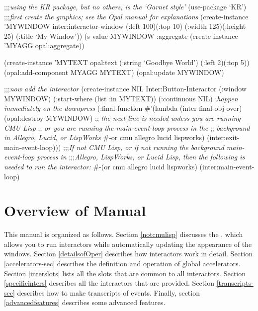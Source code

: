 \label{eventloopexample}
\begin{programexample}
;;;{\it using the KR package, but no others, is the `Garnet style'}
(use-package `KR')
;;;{\it first create the graphics; see the Opal manual for explanations}
(create-instance 'MYWINDOW inter:interactor-window
   (:left 100)(:top 10)
   (:width 125)(:height 25)
   (:title `My Window'))
(s-value MYWINDOW :aggregate (create-instance 'MYAGG opal:aggregate))

(create-instance 'MYTEXT opal:text
   (:string `Goodbye World')
   (:left 2)(:top 5))
(opal:add-component MYAGG MYTEXT)
(opal:update MYWINDOW)

;;;{\it now add the interactor}
(create-instance NIL Inter:Button-Interactor
   (:window MYWINDOW)
   (:start-where (list :in MYTEXT))
   (:continuous NIL) ;{\it happen immediately on the downpress}
   (:final-function \#'(lambda (inter final-obj-over)
                        (opal:destroy MYWINDOW)
                        ;; {\it the next line is needed unless you are running CMU Lisp}
			;; {\it or you are running the main-event-loop process in the}
                        ;; {\it background in Allegro, Lucid, or LispWorks}
			\#-or cmu allegro lucid lispworks) (inter:exit-main-event-loop)))
;;;{\it If not CMU Lisp, or if not running the background main-event-loop process in}
;;;{\it Allegro, LispWorks, or Lucid Lisp, then the following is needed to run the interactor:}
\#-(or cmu allegro lucid lispworks) (inter:main-event-loop)
\end{programexample}



\section{Overview of Manual}

This manual is organized as follows.  Section \ref{notcmulisp}
discusses the , which allows you to run interactors
while automatically updating the appearance of the windows.
Section \ref{detailsofOper}
describes how interactors work in detail.  Section \ref{accelerators-sec}
describes the definition and operation of global accelerators.  Section
\ref{interslots} lists all the slots that are common to all interactors.
Section \ref{specificinters} describes all the interactors that are provided.
Section \ref{transcripts-sec} describes how to make transcripts of events.
Finally, section \ref{advancedfeatures} describes some advanced features.

